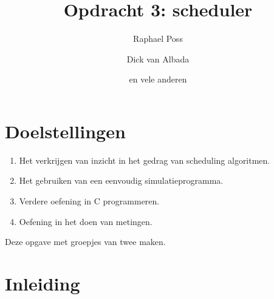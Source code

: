 \documentclass[11pt,a4paper,twoside]{article}
\begin{document}
\title{Opdracht 3: scheduler}
\author{Raphael Poss \and Dick van Albada \and en vele anderen}

\maketitle

\section{Doelstellingen}

\begin{enumerate}
\setlength{\itemsep}{1pt}
  \setlength{\parskip}{0pt}
  \setlength{\parsep}{0pt}
  \item Het verkrijgen van inzicht in het gedrag van scheduling algoritmen.
  \item Het gebruiken van een eenvoudig simulatieprogramma.
  \item Verdere oefening in C programmeren.
  \item Oefening in het doen van metingen.
  \end{enumerate}
Deze opgave met groepjes van twee maken.

\section{Inleiding}
\end{document}
